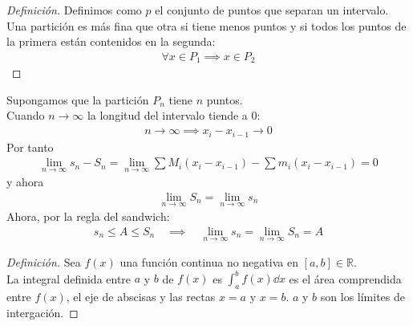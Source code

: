 \documentclass{article}
\begin{document}
\begin{proof}[Definición]
    Definimos como $p$ el conjunto de puntos que separan un intervalo. Una partición es más fina
    que otra si tiene menos puntos y si todos los puntos de la primera están contenidos en la segunda:
    \begin{equation}
        \begin{split}
            \forall x \in P_{1} \implies x \in P_{2}
        \end{split}
    \end{equation}
\end{proof}
Supongamos que la partición $P_{n}$ tiene $n$ puntos.\\
Cuando $n \to \infty$ la longitud del intervalo tiende a 0:
\begin{equation}
    \begin{split}
        n \to \infty \implies x_{i} -x_{i-1} \to 0
    \end{split}
\end{equation}
Por tanto
\begin{equation}
    \begin{split}
        \lim_{n \to \infty} s_{n} - S_{n} = \lim_{n \to \infty} \sum M_{i}(x_{i}-x_{i-1})-
        \sum m_{i}(x_{i}-x_{i-1})=0
    \end{split}
\end{equation}
y ahora
\begin{equation}
    \begin{split}
        \lim_{n \to \infty}S_{n} = \lim_{n \to \infty} s_{n}
    \end{split}
\end{equation}
Ahora, por la regla del sandwich:
\begin{equation}
    \begin{split}
        s_{n} \leq A \leq S_{n} \quad \implies \quad \lim_{n \to \infty}s_{n} = \lim_{n \to \infty}
        S_{n} = A
    \end{split}
\end{equation}
\begin{proof}[Definición]
    Sea $f(x)$ una función continua no negativa en $[a,b] \in \mathbb{R}$.\\
    La integral definida entre $a$ y $b$ de $f(x)$ es $ \int_{a}^b f(x) \dd{x}$ es el área
    comprendida entre $f(x)$, el eje de abscisas y las rectas $x=a$ y $x=b$. $a$ y $b$ son los
    límites de intergación.
\end{proof}
\end{document}
